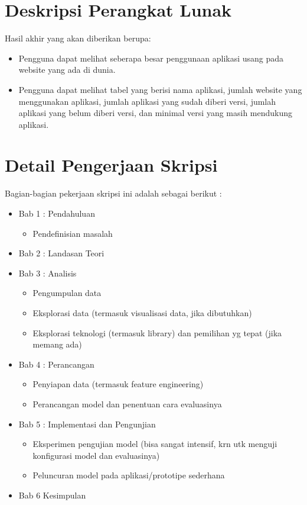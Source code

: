 \documentclass[a4paper,twoside]{article}
\begin{document}
	\section{Deskripsi Perangkat Lunak}
	Hasil akhir yang akan diberikan berupa:
	\begin{itemize}
		\item Pengguna dapat melihat seberapa besar penggunaan aplikasi usang pada website yang ada di dunia.
		\item Pengguna dapat melihat tabel yang berisi nama aplikasi, jumlah website yang menggunakan aplikasi, jumlah aplikasi yang sudah diberi versi, jumlah aplikasi yang belum diberi versi, dan  minimal versi yang masih mendukung aplikasi. 
	\end{itemize}
	
	\section{Detail Pengerjaan Skripsi}
	Bagian-bagian pekerjaan skripsi ini adalah sebagai berikut :
	\begin{itemize}
		\item Bab 1 : Pendahuluan
		\begin{itemize}
			\item Pendefinisian masalah
		\end{itemize}
		\item Bab 2 : Landasan Teori
		\item Bab 3 : Analisis
		\begin{itemize}
			\item Pengumpulan data
			\item Eksplorasi data (termasuk visualisasi data, jika dibutuhkan)
			\item Eksplorasi teknologi (termasuk library) dan pemilihan yg tepat (jika memang ada)
		\end{itemize}
		\item Bab 4 : Perancangan
		\begin{itemize}
			\item Penyiapan data (termasuk feature engineering)
			\item Perancangan model dan penentuan cara evaluasinya
		\end{itemize}
		\item Bab 5 : Implementasi dan Pengunjian
		\begin{itemize}
			\item Eksperimen pengujian model (bisa sangat intensif, krn utk menguji konfigurasi model dan evaluasinya)
			\item Peluncuran model pada aplikasi/prototipe sederhana
		\end{itemize}
		\item Bab 6 Kesimpulan
	\end{itemize}
	
\end{document}
